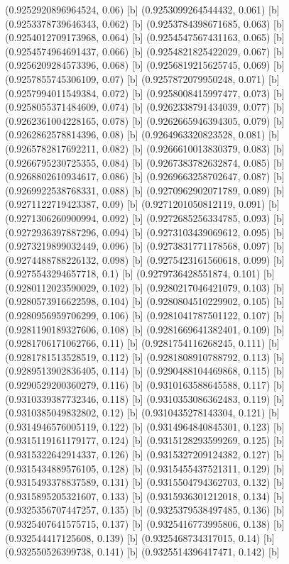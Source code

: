 {{{(0.9252920896964524, 0.06) [b] 
(0.9253099264544432, 0.061) [b] 
(0.9253378739646343, 0.062) [b] 
(0.9253784398671685, 0.063) [b] 
(0.9254012709173968, 0.064) [b] 
(0.9254547567431163, 0.065) [b] 
(0.9254574964691437, 0.066) [b] 
(0.9254821825422029, 0.067) [b] 
(0.9256209284573396, 0.068) [b] 
(0.9256819215625745, 0.069) [b] 
(0.9257855745306109, 0.07) [b] 
(0.9257872079950248, 0.071) [b] 
(0.9257994011549384, 0.072) [b] 
(0.9258008415997477, 0.073) [b] 
(0.9258055371484609, 0.074) [b] 
(0.9262338791434039, 0.077) [b] 
(0.9262361004228165, 0.078) [b] 
(0.9262665946394305, 0.079) [b] 
(0.9262862578814396, 0.08) [b] 
(0.9264963320823528, 0.081) [b] 
(0.9265782817692211, 0.082) [b] 
(0.9266610013830379, 0.083) [b] 
(0.9266795230725355, 0.084) [b] 
(0.9267383782632874, 0.085) [b] 
(0.9268802610934617, 0.086) [b] 
(0.9269663258702647, 0.087) [b] 
(0.9269922538768331, 0.088) [b] 
(0.9270962902071789, 0.089) [b] 
(0.9271122719423387, 0.09) [b] 
(0.9271201050812119, 0.091) [b] 
(0.9271306260900994, 0.092) [b] 
(0.9272685256334785, 0.093) [b] 
(0.9272936397887296, 0.094) [b] 
(0.9273103439069612, 0.095) [b] 
(0.9273219899032449, 0.096) [b] 
(0.9273831771178568, 0.097) [b] 
(0.9274488788226132, 0.098) [b] 
(0.9275423161560618, 0.099) [b] 
(0.9275543294657718, 0.1) [b] 
(0.9279736428551874, 0.101) [b] 
(0.9280112023590029, 0.102) [b] 
(0.9280217046421079, 0.103) [b] 
(0.9280573916622598, 0.104) [b] 
(0.9280804510229902, 0.105) [b] 
(0.9280956959706299, 0.106) [b] 
(0.9281041787501122, 0.107) [b] 
(0.9281190189327606, 0.108) [b] 
(0.9281669641382401, 0.109) [b] 
(0.9281706171062766, 0.11) [b] 
(0.9281754116268245, 0.111) [b] 
(0.9281781513528519, 0.112) [b] 
(0.9281808910788792, 0.113) [b] 
(0.9289513902836405, 0.114) [b] 
(0.9290488104469868, 0.115) [b] 
(0.9290529200360279, 0.116) [b] 
(0.9310163588645588, 0.117) [b] 
(0.9310339387732346, 0.118) [b] 
(0.9310353086362483, 0.119) [b] 
(0.9310385049832802, 0.12) [b] 
(0.9310435278143304, 0.121) [b] 
(0.9314946576005119, 0.122) [b] 
(0.9314964840845301, 0.123) [b] 
(0.9315119161179177, 0.124) [b] 
(0.9315128293599269, 0.125) [b] 
(0.9315322642914337, 0.126) [b] 
(0.9315327209124382, 0.127) [b] 
(0.9315434889576105, 0.128) [b] 
(0.9315455437521311, 0.129) [b] 
(0.9315493378837589, 0.131) [b] 
(0.9315504794362703, 0.132) [b] 
(0.9315895205321607, 0.133) [b] 
(0.9315936301212018, 0.134) [b] 
(0.9325356707447257, 0.135) [b] 
(0.9325379538497485, 0.136) [b] 
(0.9325407641575715, 0.137) [b] 
(0.9325416773995806, 0.138) [b] 
(0.932544417125608, 0.139) [b] 
(0.9325468734317015, 0.14) [b] 
(0.932550526399738, 0.141) [b] 
(0.9325514396417471, 0.142) [b] 
}}}
